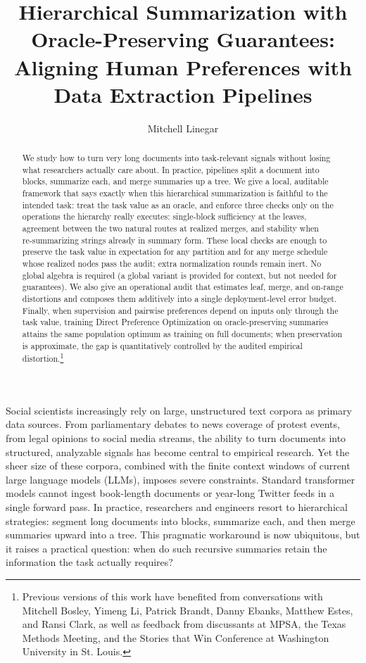 \documentclass[11pt]{article}
\title{Hierarchical Summarization with Oracle-Preserving Guarantees:\\
Aligning Human Preferences with Data Extraction Pipelines}
\author{Mitchell Linegar}
\date{}
\begin{document}
\maketitle

\begin{abstract}
We study how to turn very long documents into task‑relevant signals without losing what researchers actually care about. In practice, pipelines split a document into blocks, summarize each, and merge summaries up a tree. We give a local, auditable framework that says exactly when this hierarchical summarization is faithful to the intended task: treat the task value as an oracle, and enforce three checks only on the operations the hierarchy really executes: single‑block sufficiency at the leaves, agreement between the two natural routes at realized merges, and stability when re‑summarizing strings already in summary form. These local checks are enough to preserve the task value in expectation for any partition and for any merge schedule whose realized nodes pass the audit; extra normalization rounds remain inert. No global algebra is required (a global variant is provided for context, but not needed for guarantees). We also give an operational audit that estimates leaf, merge, and on‑range distortions and composes them additively into a single deployment‑level error budget. Finally, when supervision and pairwise preferences depend on inputs only through the task value, training Direct Preference Optimization on oracle‑preserving summaries attains the same population optimum as training on full documents; when preservation is approximate, the gap is quantitatively controlled by the audited empirical distortion.\footnote{Previous versions of this work have benefited from conversations with Mitchell Bosley, Yimeng Li, Patrick Brandt, Danny Ebanks, Matthew Estes, and Ransi Clark, as well as feedback from discussants at MPSA, the Texas Methods Meeting, and the Stories that Win Conference at Washington University in St. Louis.}
\end{abstract}

Social scientists increasingly rely on large, unstructured text corpora as primary data sources. From parliamentary debates to news coverage of protest events, from legal opinions to social media streams, the ability to turn documents into structured, analyzable signals has become central to empirical research. Yet the sheer size of these corpora, combined with the finite context windows of current large language models (LLMs), imposes severe constraints. Standard transformer models cannot ingest book-length documents or year-long Twitter feeds in a single forward pass. In practice, researchers and engineers resort to hierarchical strategies: segment long documents into blocks, summarize each, and then merge summaries upward into a tree. This pragmatic workaround is now ubiquitous, but it raises a practical question: when do such recursive summaries retain the information the task actually requires?
\end{document}
